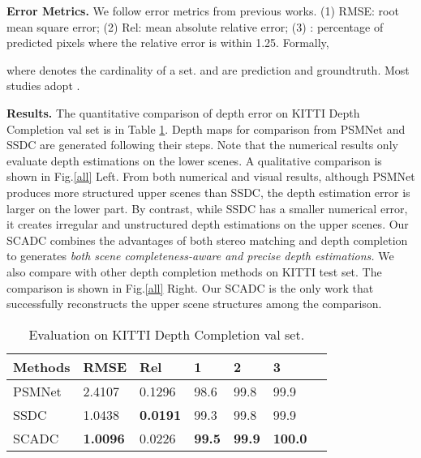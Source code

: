 \documentclass{article}
\begin{document}
\textbf{Error Metrics.} We follow error metrics from previous works. (1) RMSE: root mean square error; (2) Rel: mean absolute relative error; (3) : percentage of predicted pixels where the relative error is within 1.25. Formally,

where  denotes the cardinality of a set.  and  are prediction and groundtruth. Most studies adopt .

\textbf{Results.} The quantitative comparison of depth error on KITTI Depth Completion val set is in Table \ref{table:input_comp}. Depth maps for comparison from PSMNet \cite{chang2018pyramid} and SSDC \cite{ma2019self} are generated following their steps. Note that the numerical results only evaluate depth estimations on the lower scenes. A qualitative comparison is shown in Fig.\ref{all} Left. From both numerical and visual results, although PSMNet produces more structured upper scenes than SSDC, the depth estimation error is larger on the lower part. By contrast, while SSDC has a smaller numerical error, it creates irregular and unstructured depth estimations on the upper scenes. Our SCADC combines the advantages of both stereo matching and depth completion to generates \textit{both scene completeness-aware and precise depth estimations.} We also compare with other depth completion methods on KITTI test set. The comparison is shown in Fig.\ref{all} Right. Our SCADC is the only work that successfully reconstructs the upper scene structures among the comparison.

\begin{table}[bt!]
\begin{center}
\caption{Evaluation on KITTI Depth Completion val set.}
\label{table:input_comp}
\footnotesize
\begin{tabular}{|p{1.2cm}<{\centering}||p{0.9cm}<{\centering}|p{0.9cm}<{\centering}|p{0.9cm}<{\centering}|p{0.5cm}<{\centering}|p{0.5cm}<{\centering}|p{0.5cm}<{\centering}|}
\hline
Methods & RMSE &Rel & 1 & 2 & 3\\
\hline
PSMNet & 2.4107 & 0.1296 & 98.6 & 99.8 & 99.9\\
SSDC  & 1.0438 & \textbf{0.0191} & 99.3 & 99.8 & 99.9\\
SCADC  & \textbf{1.0096} & 0.0226 & \textbf{99.5} & \textbf{99.9} & \textbf{100.0}\\
\hline
\end{tabular}
\end{center}
\vspace{-25pt}
\end{table}
\end{document}
